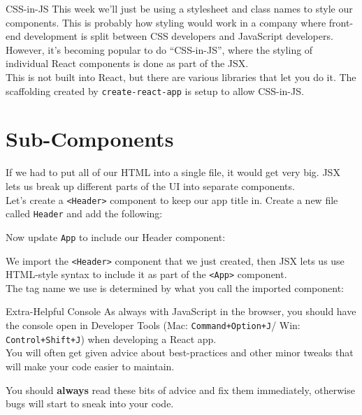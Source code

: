 \begin{infobox}{CSS-in-JS}
    This week we'll just be using a stylesheet and class names to style our components. This is probably how styling would work in a company where front-end development is split between CSS developers and JavaScript developers.
    \\

    However, it's becoming popular to do ``CSS-in-JS'', where the styling of individual React components is done as part of the JSX.
    \\

    This is not built into React, but there are various libraries that let you do it. The scaffolding created by \texttt{create-react-app} is setup to allow CSS-in-JS.
\end{infobox}


\pagebreak


\section{Sub-Components}

If we had to put all of our HTML into a single file, it would get very big. JSX lets us break up different parts of the UI into separate components.
\\

Let's create a \texttt{<Header>} component to keep our app title in. Create a new file called \texttt{Header} and add the following:


Now update \texttt{App} to include our Header component:


We import the \texttt{<Header>} component that we just created, then JSX lets us use HTML-style syntax to include it as part of the \texttt{<App>} component.
\\

The tag name we use is determined by what you call the imported component:



\begin{infobox}{Extra-Helpful Console}
    As always with JavaScript in the browser, you should have the console open in Developer Tools (Mac: \texttt{Command+Option+J}/ Win: \texttt{Control+Shift+J}) when developing a React app.
    \\

    You will often get given advice about best-practices and other minor tweaks that will make your code easier to maintain.


    You should \textbf{always} read these bits of advice and fix them immediately, otherwise bugs will start to sneak into your code.
\end{infobox}


